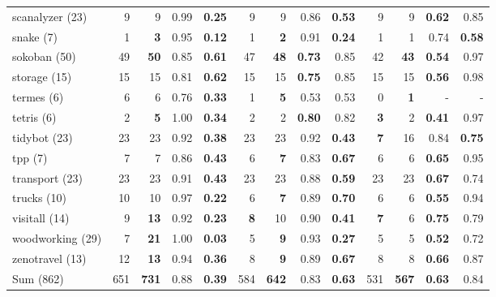 \begin{tabular}{l||rr|rr||rr|rr||rr|rr}
	scanalyzer (23) & 9 & 9 & 0.99 & \textbf{0.25}  & 9 & 9 & 0.86 & \textbf{0.53}  & 9 & 9 & \textbf{0.62}  & 0.85\\
	snake (7) & 1 & \textbf{3}  & 0.95 & \textbf{0.12}  & 1 & \textbf{2}  & 0.91 & \textbf{0.24}  & 1 & 1 & 0.74 & \textbf{0.58} \\
	sokoban (50) & 49 & \textbf{50}  & 0.85 & \textbf{0.61}  & 47 & \textbf{48}  & \textbf{0.73}  & 0.85 & 42 & \textbf{43}  & \textbf{0.54}  & 0.97\\
	storage (15) & 15 & 15 & 0.81 & \textbf{0.62}  & 15 & 15 & \textbf{0.75}  & 0.85 & 15 & 15 & \textbf{0.56}  & 0.98\\
	termes (6) & 6 & 6 & 0.76 & \textbf{0.33}  & 1 & \textbf{5}  & 0.53 & 0.53 & 0 & \textbf{1}  & - & -\\
	tetris (6) & 2 & \textbf{5}  & 1.00 & \textbf{0.34}  & 2 & 2 & \textbf{0.80}  & 0.82 & \textbf{3}  & 2 & \textbf{0.41}  & 0.97\\
	tidybot (23) & 23 & 23 & 0.92 & \textbf{0.38}  & 23 & 23 & 0.92 & \textbf{0.43}  & \textbf{7}  & 16 & 0.84 & \textbf{0.75} \\
	tpp (7) & 7 & 7 & 0.86 & \textbf{0.43}  & 6 & \textbf{7}  & 0.83 & \textbf{0.67}  & 6 & 6 & \textbf{0.65}  & 0.95\\
	transport (23) & 23 & 23 & 0.91 & \textbf{0.43}  & 23 & 23 & 0.88 & \textbf{0.59}  & 23 & 23 & \textbf{0.67}  & 0.74\\
	trucks (10) & 10 & 10 & 0.97 & \textbf{0.22}  & 6 & \textbf{7}  & 0.89 & \textbf{0.70}  & 6 & 6 & \textbf{0.55}  & 0.94\\
	visitall (14) & 9  & \textbf{13} & 0.92 & \textbf{0.23}  & \textbf{8}  & 10 & 0.90 & \textbf{0.41}  & \textbf{7}  & 6 & \textbf{0.75}  & 0.79\\
	woodworking (29) & 7  & \textbf{21} & 1.00 & \textbf{0.03}  & 5 & \textbf{9}  & 0.93 & \textbf{0.27}  & 5 & 5 & \textbf{0.52}  & 0.72\\
	zenotravel (13) & 12 & \textbf{13}  & 0.94 & \textbf{0.36}  & 8 & \textbf{9}  & 0.89 & \textbf{0.67}  & 8 & 8 & \textbf{0.66}  & 0.87\\\hline
	Sum (862) & 651 & \textbf{731}  & 0.88 & \textbf{0.39}  & 584 & \textbf{642}  & 0.83 & \textbf{0.63}  & 531 & \textbf{567}  & \textbf{0.63}  & 0.84\\
	\end{tabular}
